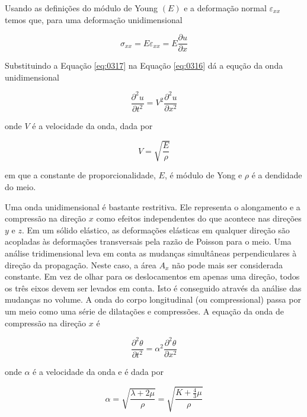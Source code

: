\documentclass[]{book}
\theoremstyle{definition}
\theoremstyle{definition}
\theoremstyle{definition}
\theoremstyle{remark}
\begin{document}
Usando as definições do módulo de Young \((E)\) e a deformação normal \(\varepsilon_{xx}\) temos que, para uma deformação unidimensional

\begin{equation}
\sigma_{x x}=E \varepsilon_{x x}=E \frac{\partial u}{\partial x}  \label{eq:0317}
\end{equation}

Substituindo a Equação \eqref{eq:0317} na Equação \eqref{eq:0316} dá a equção da onda unidimensional

\begin{equation}
\frac{\partial^{2} u}{\partial t^{2}}=V^{2} \frac{\partial^{2} u}{\partial x^{2}}  \label{eq:0318}
\end{equation}

onde \(V\) é a velocidade da onda, dada por

\begin{equation}
V=\sqrt{\frac{E}{\rho}}  \label{eq:0319}
\end{equation}

em que a constante de proporcionalidade, \(E\), é módulo de Yong e \(\rho\) é a dendidade do meio.

Uma onda unidimensional é bastante restritiva. Ele representa o alongamento e a compressão na direção \(x\) como efeitos independentes do que acontece nas direções \(y\) e \(z\). Em um sólido elástico, as deformações elásticas em qualquer direção são acopladas às deformações transversais pela razão de Poisson para o meio. Uma análise tridimensional leva em conta as mudanças simultâneas perpendiculares à direção da propagação. Neste caso, a área \(A_x\) não pode mais ser considerada constante. Em vez de olhar para os deslocamentos em apenas uma direção, todos os três eixos devem ser levados em conta. Isto é conseguido através da análise das mudanças no volume. A onda do corpo longitudinal (ou compressional) passa por um meio como uma série de dilatações e compressões. A equação da onda de compressão na direção \(x\) é

\begin{equation}
\frac{\partial^{2} \theta}{\partial t^{2}}=\alpha^{2} \frac{\partial^{2} \theta}{\partial x^{2}} \label{eq:0320}
\end{equation}

onde \(\alpha\) é a velocidade da onda e é dada por

\begin{equation}
\alpha=\sqrt{\frac{\lambda+2 \mu}{\rho}}=\sqrt{\frac{K+\frac{4}{3} \mu}{\rho}} \label{eq:0321}
\end{equation}
\end{document}

